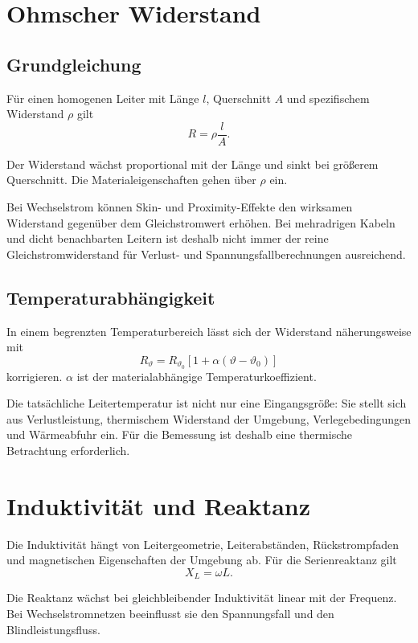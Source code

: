 \section{Ohmscher Widerstand}

\subsection{Grundgleichung}

Für einen homogenen Leiter mit Länge \(l\), Querschnitt \(A\) und
spezifischem Widerstand \(\rho\) gilt
\[
  R=\rho\frac{l}{A}.
\]

Der Widerstand wächst proportional mit der Länge und sinkt bei größerem
Querschnitt. Die Materialeigenschaften gehen über \(\rho\) ein.

Bei Wechselstrom können Skin- und Proximity-Effekte den wirksamen Widerstand
gegenüber dem Gleichstromwert erhöhen. Bei mehradrigen Kabeln und dicht
benachbarten Leitern ist deshalb nicht immer der reine Gleichstromwiderstand
für Verlust- und Spannungsfallberechnungen ausreichend.

\subsection{Temperaturabhängigkeit}

In einem begrenzten Temperaturbereich lässt sich der Widerstand näherungsweise
mit
\[
  R_\vartheta=R_{\vartheta_0}
  \left[1+\alpha(\vartheta-\vartheta_0)\right]
\]
korrigieren. \(\alpha\) ist der materialabhängige Temperaturkoeffizient.

Die tatsächliche Leitertemperatur ist nicht nur eine Eingangsgröße:
Sie stellt sich aus Verlustleistung, thermischem Widerstand der Umgebung,
Verlegebedingungen und Wärmeabfuhr ein. Für die Bemessung ist deshalb eine
thermische Betrachtung erforderlich.

\section{Induktivität und Reaktanz}

Die Induktivität hängt von Leitergeometrie, Leiterabständen, Rückstrompfaden
und magnetischen Eigenschaften der Umgebung ab. Für die Serienreaktanz gilt
\[
  X_L=\omega L.
\]

Die Reaktanz wächst bei gleichbleibender Induktivität linear mit der Frequenz.
Bei Wechselstromnetzen beeinflusst sie den Spannungsfall und den Blindleistungsfluss.

